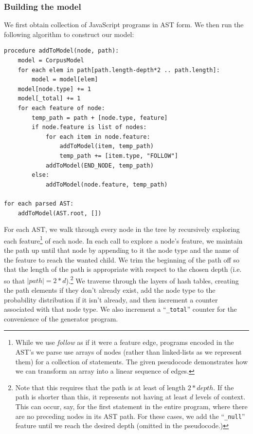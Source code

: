 \documentclass{article}
\begin{document}
\subsubsection{Building the model}

We first obtain collection of JavaScript programs in AST form. We then run the following algorithm to construct our model:

\begin{verbatim}
procedure addToModel(node, path):
    model = CorpusModel
    for each elem in path[path.length-depth*2 .. path.length]:
        model = model[elem]
    model[node.type] += 1
    model[_total] += 1
    for each feature of node:
        temp_path = path + [node.type, feature]
        if node.feature is list of nodes:
            for each item in node.feature:
                addToModel(item, temp_path)
                temp_path += [item.type, "FOLLOW"]
            addToModel(END_NODE, temp_path)
        else:
            addToModel(node.feature, temp_path)

for each parsed AST:
    addToModel(AST.root, [])
\end{verbatim}

For each AST, we walk through every node in the tree by recursively exploring each feature\footnote{While we use \emph{follow} as if it were a feature edge, programs encoded in the AST's we parse use arrays of nodes (rather than linked-lists as we represent them) for a collection of statements. The given pseudocode demonstrates how we can transform an array into a linear sequence of edges.} of each node. In each call to explore a node's feature, we maintain the path up until that node by appending to it the node type and the name of the feature to reach the wanted child. We trim the beginning of the path off so that the length of the path is appropriate with respect to the chosen depth (i.e. so that $|path| = 2*d$).\footnote{Note that this requires that the path is at least of length $2*depth$. If the path is shorter than this, it represents not having at least $d$ levels of context. This can occur, say, for the first statement in the entire program, where there are no preceding nodes in its AST path. For these cases, we add the ``{\tt \_null}'' feature until we reach the desired depth (omitted in the pseudocode.)} We traverse through the layers of hash tables, creating the path elements if they don't already exist, add the node type to the probability distribution if it isn't already, and then increment a counter associated with that node type. We also increment a ``{\tt \_total}'' counter for the convenience of the generator program.
\end{document}

